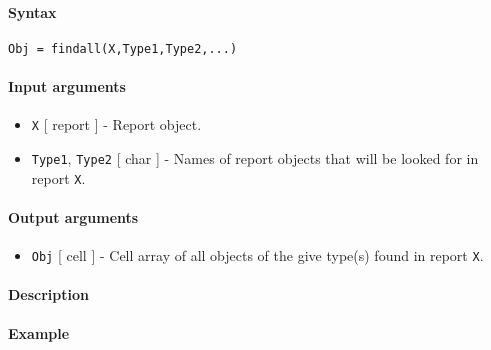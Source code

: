 


	\paragraph{Syntax}

\begin{verbatim}
Obj = findall(X,Type1,Type2,...)
\end{verbatim}

\paragraph{Input arguments}

\begin{itemize}
\item
  \texttt{X} {[} report {]} - Report object.
\item
  \texttt{Type1}, \texttt{Type2} {[} char {]} - Names of report objects
  that will be looked for in report \texttt{X}.
\end{itemize}

\paragraph{Output arguments}

\begin{itemize}
\itemsep1pt\parskip0pt
\item
  \texttt{Obj} {[} cell {]} - Cell array of all objects of the give
  type(s) found in report \texttt{X}.
\end{itemize}

\paragraph{Description}

\paragraph{Example}


